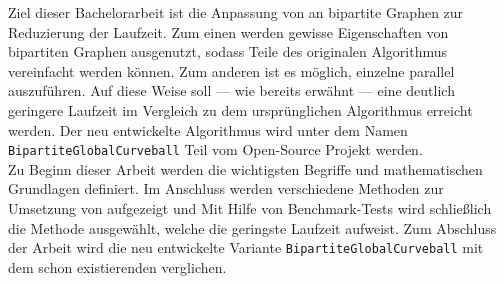 Ziel dieser Bachelorarbeit ist die Anpassung von \gc{} an bipartite Graphen zur 
Reduzierung der Laufzeit. Zum einen werden gewisse 
Eigenschaften von bipartiten Graphen ausgenutzt, sodass Teile des originalen \gc{} Algorithmus
vereinfacht werden können. Zum anderen ist es möglich, einzelne  parallel auszuführen.
Auf diese Weise soll --- wie bereits erwähnt --- eine deutlich geringere Laufzeit im Vergleich zu dem ursprünglichen \gc{}
Algorithmus erreicht werden.
Der neu entwickelte Algorithmus wird unter dem Namen \texttt{BipartiteGlobalCurveball} 
Teil vom Open-Source Projekt \nk{} werden.
\\

Zu Beginn dieser Arbeit werden die wichtigsten Begriffe und mathematischen Grundlagen definiert.
Im Anschluss werden verschiedene Methoden zur Umsetzung von \gc{}  aufgezeigt und  
Mit Hilfe von Benchmark-Tests wird schließlich die Methode ausgewählt, welche die geringste Laufzeit 
aufweist. Zum Abschluss der Arbeit wird die neu entwickelte Variante \texttt{BipartiteGlobalCurveball} 
mit dem schon existierenden \gc{} verglichen.
